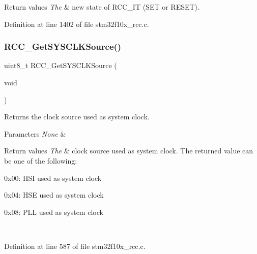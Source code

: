 \begin{DoxyRetVals}{Return values}
{\em The} & new state of R\+C\+C\+\_\+\+IT (S\+ET or R\+E\+S\+ET). \\
\hline
\end{DoxyRetVals}


Definition at line 1402 of file stm32f10x\+\_\+rcc.\+c.

\mbox{\label{group___r_c_c___exported___functions_gaaeb32311c208b2a980841c9c884a41ea}} 
\subsubsection{\texorpdfstring{R\+C\+C\+\_\+\+Get\+S\+Y\+S\+C\+L\+K\+Source()}{RCC\_GetSYSCLKSource()}}
{\footnotesize\ttfamily uint8\+\_\+t R\+C\+C\+\_\+\+Get\+S\+Y\+S\+C\+L\+K\+Source (\begin{DoxyParamCaption}\item[{void}]{ }\end{DoxyParamCaption})}



Returns the clock source used as system clock. 


\begin{DoxyParams}{Parameters}
{\em None} & \\
\hline
\end{DoxyParams}

\begin{DoxyRetVals}{Return values}
{\em The} & clock source used as system clock. The returned value can be one of the following\+:
\begin{DoxyItemize}
\item 0x00\+: H\+SI used as system clock
\item 0x04\+: H\+SE used as system clock
\item 0x08\+: P\+LL used as system clock 
\end{DoxyItemize}\\
\hline
\end{DoxyRetVals}


Definition at line 587 of file stm32f10x\+\_\+rcc.\+c.

